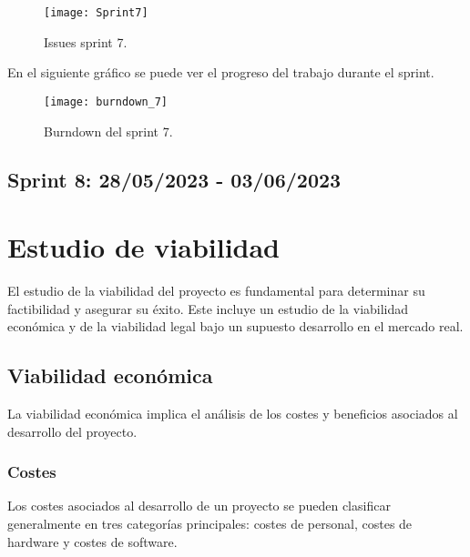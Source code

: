 \newpage
\begin{figure}[htb]
    \centering
    \texttt{[image: Sprint7]}
    \caption{Issues sprint 7.}
    \label{fig:Sprint7}
\end{figure}
\newpage
En el siguiente gráfico se puede ver el progreso del trabajo durante el sprint.
\begin{figure}[htb]
    \centering
    \texttt{[image: burndown\_7]}
    \caption{Burndown del sprint 7.}
    \label{fig:burndown_7}
\end{figure}

\subsection{Sprint 8: 28/05/2023 - 03/06/2023}

\section{Estudio de viabilidad}
El estudio de la viabilidad del proyecto es fundamental para determinar su factibilidad y asegurar su éxito.
Este incluye un estudio de la viabilidad económica y de la viabilidad legal bajo un supuesto desarrollo en el mercado real.

\subsection{Viabilidad económica}
La viabilidad económica implica el análisis de los costes y beneficios asociados al desarrollo del proyecto.

\subsubsection{Costes}
Los costes asociados al desarrollo de un proyecto se pueden clasificar generalmente en tres categorías principales: costes de personal, costes de hardware y costes de software.

